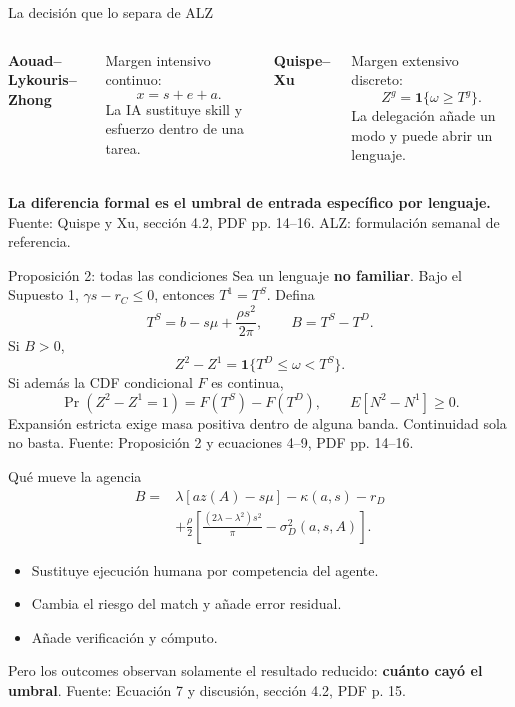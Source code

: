\documentclass[aspectratio=169,11pt]{beamer}
\newcommand{\source}[1]{\vfill{\color{Gray}\tiny Fuente: #1}}
\newcommand{\key}[1]{{\color{Coral}\bfseries #1}}
\begin{document}
\begin{frame}{La decisión que lo separa de ALZ}
  \begin{columns}[T,onlytextwidth]
    \textbf{Aouad--Lykouris--Zhong}

    \vspace{0.2cm}
    Margen intensivo continuo:
    \[
    x=s+e+a.
    \]
    La IA sustituye skill y esfuerzo dentro de una tarea.

    \textbf{Quispe--Xu}

    \vspace{0.2cm}
    Margen extensivo discreto:
    \[
    Z^g=\mathbf1\{\omega\ge T^g\}.
    \]
    La delegación añade un modo y puede abrir un lenguaje.
  \end{columns}

  \vspace{0.55cm}
  \key{La diferencia formal es el umbral de entrada específico por lenguaje.}
  \source{Quispe y Xu, sección 4.2, PDF pp. 14--16. ALZ: formulación semanal de referencia.}
\end{frame}

\begin{frame}{Proposición 2: todas las condiciones}
  \small
  Sea un lenguaje \textbf{no familiar}. Bajo el Supuesto 1,
  \(\gamma s-r_C\le0\), entonces \(T^1=T^S\). Defina
  \[
  T^S=b-s\mu+\frac{\rho s^2}{2\pi},\qquad B=T^S-T^D.
  \]
  Si \(B>0\),
  \[
  \boxed{Z^2-Z^1=\mathbf1\{T^D\le\omega<T^S\}}.
  \]
  Si además la CDF condicional \(F\) es continua,
  \[
  \Pr(Z^2-Z^1=1)=F(T^S)-F(T^D),\qquad
  E[N^2-N^1]\ge0.
  \]
  Expansión estricta exige masa positiva dentro de alguna banda. Continuidad sola no basta.
  \source{Proposición 2 y ecuaciones 4--9, PDF pp. 14--16.}
\end{frame}

\begin{frame}{Qué mueve la agencia}
  \[
  \begin{aligned}
  B={}&\lambda[az(A)-s\mu]-\kappa(a,s)-r_D\\
  &+\frac{\rho}{2}\left[\frac{(2\lambda-\lambda^2)s^2}{\pi}-\sigma_D^2(a,s,A)\right].
  \end{aligned}
  \]
  \begin{itemize}
    \item Sustituye ejecución humana por competencia del agente.
    \item Cambia el riesgo del match y añade error residual.
    \item Añade verificación y cómputo.
  \end{itemize}
  Pero los outcomes observan solamente el resultado reducido: \key{cuánto cayó el umbral}.
  \source{Ecuación 7 y discusión, sección 4.2, PDF p. 15.}
\end{frame}
\end{document}
